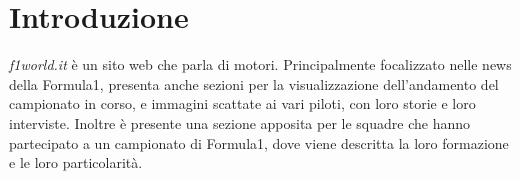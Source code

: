 \section{Introduzione}

\textit{f1world.it} \`e un sito web che parla di motori. Principalmente
focalizzato nelle news della Formula1, presenta anche sezioni per la
visualizzazione dell'andamento del campionato in corso, e immagini scattate ai
vari piloti, con loro storie e loro interviste. Inoltre \`e presente una sezione
apposita per le squadre che hanno partecipato a un campionato di Formula1, dove
viene descritta la loro formazione e le loro particolarit\`a.

